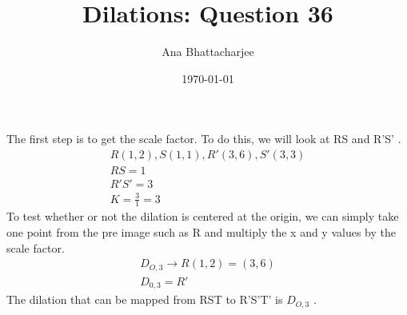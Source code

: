 \documentclass{article}
\begin{document}
\title{Dilations: Question 36}
\author{Ana Bhattacharjee}
\date{\today}
\maketitle{}

\begin{center}
The first step is to get the scale factor. To do this, we will look at RS and R'S' .
\begin{align}
R (1, 2), S (1,1), R' (3, 6), S' (3,3) \\
RS = 1 \\
R'S' = 3 \\
K = \frac{3}{1} = 3
\end{align}
To test whether or not the dilation is centered at the origin, we can simply take one point from the pre image such as R and multiply the x and y values by the scale factor.
\begin{align}
  D_{O, 3} \rightarrow R (1, 2) = (3, 6) \\
  D_{0, 3} = R'
\end{align}
The dilation that can be mapped from RST to R'S'T' is $D_{O, 3}$ .
\end{center}
\end{document}
